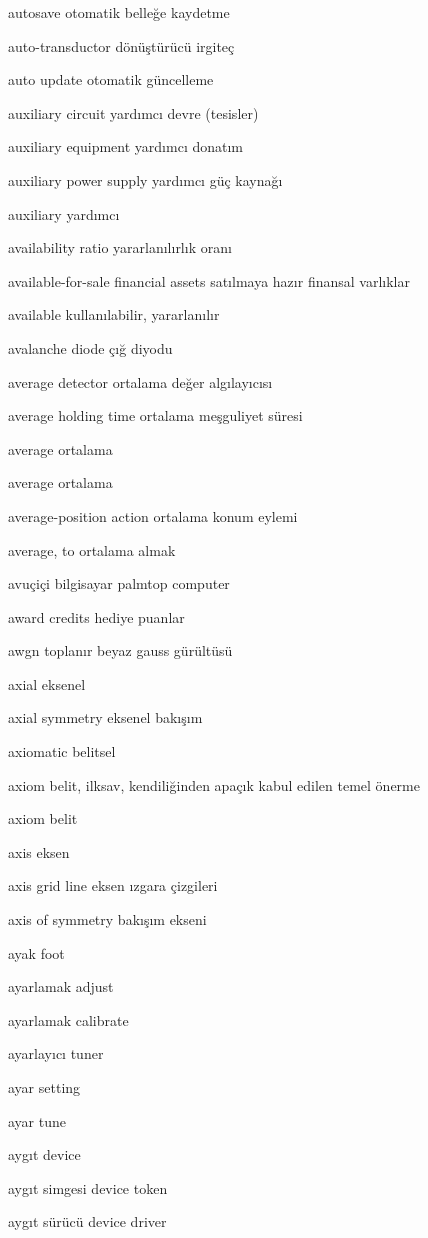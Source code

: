 \documentclass[12pt,fleqn]{article}\usepackage{../../common}
\begin{document}
autosave otomatik belleğe kaydetme

auto-transductor dönüştürücü irgiteç

auto update otomatik güncelleme

auxiliary circuit yardımcı devre (tesisler)

auxiliary equipment yardımcı donatım

auxiliary power supply yardımcı güç kaynağı

auxiliary yardımcı

availability ratio yararlanılırlık oranı

available-for-sale financial assets satılmaya hazır finansal varlıklar

available kullanılabilir, yararlanılır

avalanche diode çığ diyodu

average detector ortalama değer algılayıcısı

average holding time ortalama meşguliyet süresi

average ortalama

average ortalama

average-position action ortalama konum eylemi

average, to ortalama almak

avuçiçi bilgisayar palmtop computer

award credits hediye puanlar

awgn toplanır beyaz gauss gürültüsü

axial eksenel

axial symmetry eksenel bakışım

axiomatic belitsel

axiom belit, ilksav, kendiliğinden apaçık kabul edilen temel önerme

axiom belit

axis eksen

axis grid line eksen ızgara çizgileri

axis of symmetry bakışım ekseni

ayak foot

ayarlamak adjust

ayarlamak calibrate

ayarlayıcı tuner

ayar setting

ayar tune

aygıt device

aygıt simgesi device token

aygıt sürücü device driver
\end{document}
